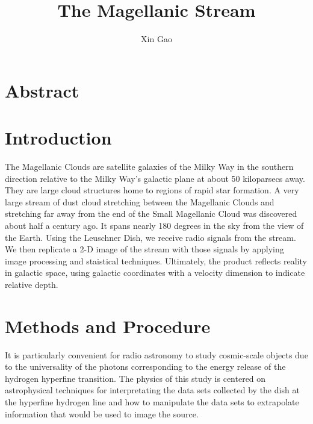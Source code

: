 \documentclass{article}
\title{The Magellanic Stream}
\author{Xin Gao}
\date{}
\begin{document}
\maketitle

\section{Abstract}
\section{Introduction}
The Magellanic Clouds are satellite galaxies of the Milky Way in the
southern direction relative to the Milky Way's galactic plane at about
50 kiloparsecs away. They are large cloud structures home to regions of
rapid star formation. A very large stream of dust cloud stretching
between the Magellanic Clouds and stretching far away from the end of
the Small Magellanic Cloud was discovered  about half a century ago. It
spans nearly 180 degrees in the sky from the view of the Earth. Using
the Leuschner Dish, we receive radio signals from the stream. We then 
replicate a 2-D image of the stream with those signals by applying image
processing and staistical techniques. Ultimately, the product reflects
reality in galactic space, using galactic coordinates with a velocity
dimension to indicate relative depth.
\section{Methods and Procedure}
It is particularly convenient for radio astronomy to study
cosmic-scale objects due to the universality of the photons
corresponding to the energy release of the hydrogen hyperfine
transition. The physics of this study is centered on astrophysical
techniques for interpretating the data sets collected by the dish at the
hyperfine hydrogen line and how to manipulate the data sets to
extrapolate information that would be used to image the source.  
\end{document}
